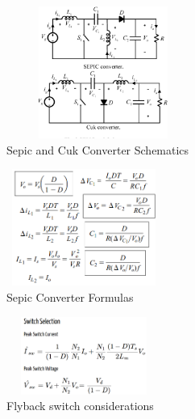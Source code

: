 \documentclass[twocolumn]{article}
\begin{document}


\begin{figure}[!ht]
	\includegraphics[width=2.5in,height=1.7in]{sepic_and_cuk_schematic.png}
	\caption{Sepic and Cuk Converter Schematics}
\end{figure}

\begin{figure}[!ht]
	\includegraphics[width=2in,height=1.5in]{sepicformulas.png}
	\caption{Sepic Converter Formulas}
\end{figure}


  \begin{figure}[!ht]
	\includegraphics[width=2in,height=1in]{flybak_switch}
	\caption{Flyback switch considerations}
\end{figure}
\end{document}
